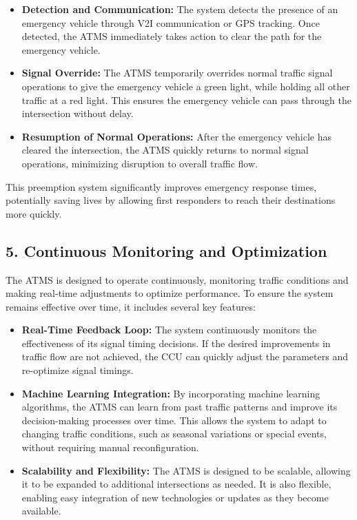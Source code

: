 \documentclass{scrreprt}
\begin{document}
\begin{itemize}
    \item \textbf{Detection and Communication:} 
    The system detects the presence of an emergency vehicle through V2I communication or GPS tracking. Once detected, the ATMS immediately takes action to clear the path for the emergency vehicle.

    \item \textbf{Signal Override:} 
    The ATMS temporarily overrides normal traffic signal operations to give the emergency vehicle a green light, while holding all other traffic at a red light. This ensures the emergency vehicle can pass through the intersection without delay.

    \item \textbf{Resumption of Normal Operations:} 
    After the emergency vehicle has cleared the intersection, the ATMS quickly returns to normal signal operations, minimizing disruption to overall traffic flow.
\end{itemize}

This preemption system significantly improves emergency response times, potentially saving lives by allowing first responders to reach their destinations more quickly.

\subsection*{5. Continuous Monitoring and Optimization}

The ATMS is designed to operate continuously, monitoring traffic conditions and making real-time adjustments to optimize performance. To ensure the system remains effective over time, it includes several key features:

\begin{itemize}
    \item \textbf{Real-Time Feedback Loop:} 
    The system continuously monitors the effectiveness of its signal timing decisions. If the desired improvements in traffic flow are not achieved, the CCU can quickly adjust the parameters and re-optimize signal timings.

    \item \textbf{Machine Learning Integration:} 
    By incorporating machine learning algorithms, the ATMS can learn from past traffic patterns and improve its decision-making processes over time. This allows the system to adapt to changing traffic conditions, such as seasonal variations or special events, without requiring manual reconfiguration.

    \item \textbf{Scalability and Flexibility:} 
    The ATMS is designed to be scalable, allowing it to be expanded to additional intersections as needed. It is also flexible, enabling easy integration of new technologies or updates as they become available.
\end{itemize}
\end{document}
